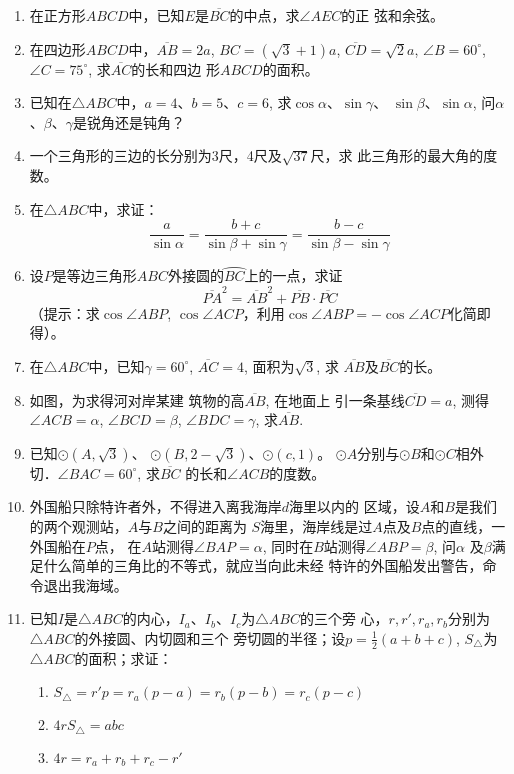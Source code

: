 \begin{enumerate}
\item 在正方形$ABCD$中，已知$E$是$\overline{BC}$的中点，求$\angle AEC$的正
弦和余弦。
\item 在四边形$ABCD$中，$\overline{AB}=2a$, $BC=(\sqrt{3}+1)a$, 
$\overline{CD}=\sqrt{2}a$, $\angle B=60^{\circ}$, $\angle C=75^{\circ}$, 求$\overline{AC}$的长和四边
形$ABCD$的面积。
\item 已知在$\triangle ABC$中，$a=4$、$b=5$、$c=6$, 求$\cos\alpha$、$\sin\gamma$、
$\sin\beta$、$\sin\alpha$, 问$\alpha$、$\beta$、$\gamma$是锐角还是钝角？
\item 一个三角形的三边的长分别为3尺，4尺及$\sqrt{37}$尺，求
此三角形的最大角的度数。
\item 在$\triangle ABC$中，求证：
\[\frac{a}{\sin\alpha}=\frac{b+c}{\sin\beta+\sin\gamma}=\frac{b-c}{\sin\beta-\sin\gamma}\]
\item 设$P$是等边三角形$ABC$外接圆的$\wideparen{BC}$上的一点，求证
\[\overline{PA}^2=\overline{AB}^2+\overline{PB}\cdot \overline{PC}\]
（提示：求$\cos\angle ABP$, $\cos\angle ACP$，利用$\cos\angle ABP=-\cos\angle ACP$化简即得）。
\item 在$\triangle ABC$中，已知$\gamma=60^{\circ}$, $\overline{AC}=4$, 面积为$\sqrt{3}$, 求
$\overline{AB}$及$\overline{BC}$的长。
\item 如图，为求得河对岸某建
筑物的高$\overline{AB}$, 在地面上
引一条基线$\overline{CD}=a$, 测得
$\angle ACB=\alpha$, $\angle BCD=\beta$, 
$\angle BDC=\gamma$, 求$\overline{AB}$.
\item 已知$\odot (A,\sqrt{3})$、
$\odot (B,2-\sqrt{3})$、$\odot (c,1)$。
$\odot A$分别与$\odot B$和$\odot C$相外
切．$\angle BAC=60^{\circ}$, 求$\overline{BC}$
的长和$\angle ACB$的度数。

\item 外国船只除特许者外，不得进入离我海岸$d$海里以内的
区域，设$A$和$B$是我们的两个观测站，$A$与$B$之间的距离为
$S$海里，海岸线是过$A$点及$B$点的直线，一外国船在$P$点，
在$A$站测得$\angle BAP=\alpha$, 同时在$B$站测得$\angle ABP=\beta$, 问$\alpha$
及$\beta$满足什么简单的三角比的不等式，就应当向此未经
特许的外国船发出警告，命令退出我海域。
\item 已知$I$是$\triangle ABC$的内心，$I_a$、$I_b$、$I_c$为$\triangle ABC$的三个旁
心，$r,r',r_a,r_b$分别为$\triangle ABC$的外接圆、内切圆和三个
旁切圆的半径；设$p=\frac{1}{2}(a+b+c)$, $S_{\triangle}$为$\triangle ABC$的面积；求证：
\begin{enumerate}
    \item $S_{\triangle}=r'p=r_a(p-a)=r_b(p-b)=r_c(p-c)$
    \item $4rS_{\triangle}=abc$
    \item $4r=r_a+r_b+r_c-r'$
\end{enumerate}


\end{enumerate}

